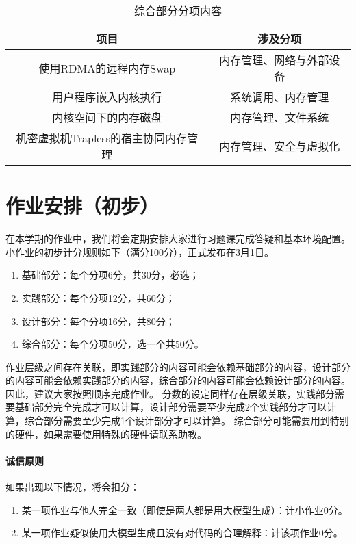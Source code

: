 \begin{table}[htbp]
\centering

\caption{综合部分分项内容}
\label{fig:intro:mixed}
\begin{tabular}{c|c}
\hline
项目              & 涉及分项         \\ \hline
使用RDMA的远程内存Swap & 内存管理、网络与外部设备 \\ \hline
用户程序嵌入内核执行 & 系统调用、内存管理 \\ \hline
内核空间下的内存磁盘 & 内存管理、文件系统 \\ \hline
机密虚拟机Trapless的宿主协同内存管理 & 内存管理、安全与虚拟化 \\ \hline

\end{tabular}

\end{table}

\section{作业安排（初步）}

在本学期的作业中，我们将会定期安排大家进行习题课完成答疑和基本环境配置。小作业的初步计分规则如下（满分100分），正式发布在3月1日。

\begin{enumerate}
    \item 基础部分：每个分项6分，共30分，必选；
    \item 实践部分：每个分项12分，共60分；
    \item 设计部分：每个分项16分，共80分；
    \item 综合部分：每个分项50分，选一个共50分。
\end{enumerate}

作业层级之间存在关联，即实践部分的内容可能会依赖基础部分的内容，设计部分的内容可能会依赖实践部分的内容，综合部分的内容可能会依赖设计部分的内容。因此，建议大家按照顺序完成作业。
分数的设定同样存在层级关联，实践部分需要基础部分完全完成才可以计算，设计部分需要至少完成2个实践部分才可以计算，综合部分需要至少完成1个设计部分才可以计算。
综合部分可能需要用到特别的硬件，如果需要使用特殊的硬件请联系助教。

\paragraph*{诚信原则}
如果出现以下情况，将会扣分：
\begin{enumerate}
    \item 某一项作业与他人完全一致（即使是两人都是用大模型生成）：计小作业0分。
    \item 某一项作业疑似使用大模型生成且没有对代码的合理解释：计该项作业0分。
\end{enumerate}

